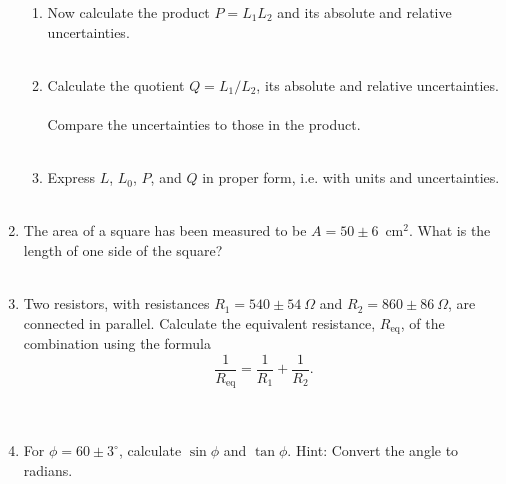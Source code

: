 \begin{enumerate}
\begin{enumerate}
\item Now calculate the product $P = L_1 L_2$ and its absolute and relative
uncertainties. \\
\vspace*{2cm} \\

\item Calculate the quotient $Q=L_1/L_2$, its absolute and relative
uncertainties. \\
\vspace*{2cm} \\
\noindent Compare the uncertainties to those in the product. \\
\vspace*{2cm} \\

\item Express $L$, $L_0$, $P$, and $Q$ in proper form, i.e. with units and 
uncertainties.  \\
\vspace*{3cm} \\
\end{enumerate}

\item The area of a square has been measured to be $A=50\pm 6$~cm$^2$. What is
the length of one side of the square?  \\
\vspace*{2cm} \\

\item Two resistors, with resistances $R_1=540\pm 54~\Omega$ and 
$R_2=860\pm 86~\Omega$, are connected in parallel. Calculate the equivalent 
resistance, $R_{\mbox{eq}}$, of the combination using the formula 
$$ \frac{1}{R_{\mbox{eq}}} = \frac{1}{R_1} + \frac{1}{R_2}.$$ \\
\vspace*{10cm} \\

\item For $\phi=60\pm 3^\circ$, calculate $\sin\phi$ and $\tan\phi$.
Hint: Convert the angle to radians. \\
\vspace*{3cm} \\


\end{enumerate}
